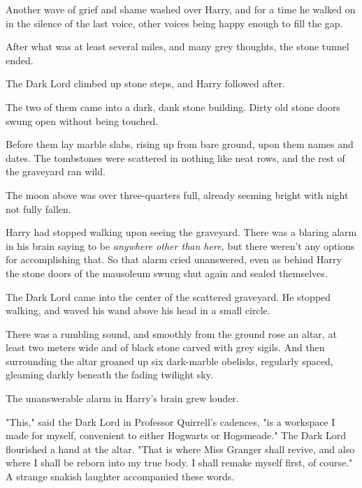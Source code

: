 Another wave of grief and shame washed over Harry, and for a time he walked on
in the silence of the last voice, other voices being happy enough to fill the
gap.

After what was at least several miles, and many grey thoughts, the stone tunnel
ended.

The Dark Lord climbed up stone steps, and Harry followed after.

The two of them came into a dark, dank stone building. Dirty old stone doors
swung open without being touched.

Before them lay marble slabs, rising up from bare ground, upon them names and
dates. The tombstones were scattered in nothing like neat rows, and the rest of
the graveyard ran wild.

The moon above was over three-quarters full, already seeming bright with night
not fully fallen.

Harry had stopped walking upon seeing the graveyard. There was a blaring alarm
in his brain saying to be \emph{anywhere other than here,} but there weren't
any options for accomplishing that. So that alarm cried unanswered, even as
behind Harry the stone doors of the mausoleum swung shut again and sealed
themselves.

The Dark Lord came into the center of the scattered graveyard. He stopped
walking, and waved his wand above his head in a small circle.

There was a rumbling sound, and smoothly from the ground rose an altar, at
least two meters wide and of black stone carved with grey sigils. And then
surrounding the altar groaned up six dark-marble obelisks, regularly spaced,
gleaming darkly beneath the fading twilight sky.

The unanswerable alarm in Harry's brain grew louder.

"This," said the Dark Lord in Professor Quirrell's cadences, "is a workspace I
made for myself, convenient to either Hogwarts or Hogsmeade." The Dark Lord
flourished a hand at the altar. "That is where Miss Granger shall revive, and
also where I shall be reborn into my true body. I shall remake myself first, of
course."  A strange
snakish laughter accompanied these words. 

